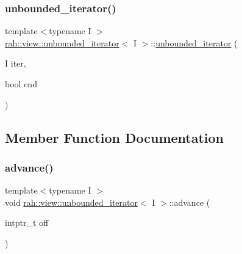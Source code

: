 \mbox{\label{structrah_1_1view_1_1unbounded__iterator_a6043d431a0b2db6691397dd8029287b4}} 
\subsubsection{\texorpdfstring{unbounded\_iterator()}{unbounded\_iterator()}\hspace{0.1cm}{\footnotesize\ttfamily [4/4]}}
{\footnotesize\ttfamily template$<$typename I $>$ \\
\mbox{\hyperlink{structrah_1_1view_1_1unbounded__iterator}{rah\+::view\+::unbounded\+\_\+iterator}}$<$ I $>$\+::\mbox{\hyperlink{structrah_1_1view_1_1unbounded__iterator}{unbounded\+\_\+iterator}} (\begin{DoxyParamCaption}\item[{I}]{iter,  }\item[{bool}]{end }\end{DoxyParamCaption})\hspace{0.3cm}{\ttfamily [inline]}}



\subsection{Member Function Documentation}
\mbox{\label{structrah_1_1view_1_1unbounded__iterator_ac5605e2d9558a9569c0e24dcf7a78c10}} 
\subsubsection{\texorpdfstring{advance()}{advance()}\hspace{0.1cm}{\footnotesize\ttfamily [1/2]}}
{\footnotesize\ttfamily template$<$typename I $>$ \\
void \mbox{\hyperlink{structrah_1_1view_1_1unbounded__iterator}{rah\+::view\+::unbounded\+\_\+iterator}}$<$ I $>$\+::advance (\begin{DoxyParamCaption}\item[{intptr\+\_\+t}]{off }\end{DoxyParamCaption})\hspace{0.3cm}{\ttfamily [inline]}}


